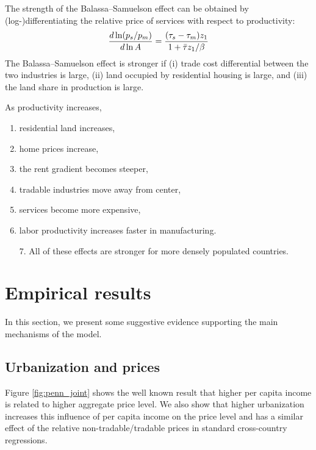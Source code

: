 \documentclass[12pt]{article}
\begin{document}
The strength of the Balassa--Samuelson effect can be obtained by (log-)differentiating the relative price of services with respect to productivity:
\[
\frac{d\ln (p_s/p_m)}{d\ln A} = \frac{(\tau_s-\tau_m)z_1}{1+\Bar\tau z_1/\beta}
\]
The Balassa--Samuelson effect is stronger if (i) trade cost differential between the two industries is large,       (ii) land occupied by residential housing is large, and (iii) the land share in production is large.



As productivity increases,
\begin{enumerate}
    \item residential land increases,
    \item home prices increase,
    \item the rent gradient becomes steeper,
	\item tradable industries move away from center,
    \item services become more expensive,
	\item labor productivity increases faster in manufacturing.
\end{enumerate}
\begin{enumerate}
	\item[7.] All of these effects are stronger for more densely populated countries.
\end{enumerate}





\section{Empirical results}\label{empirics}
In this section, we present some suggestive evidence supporting the
main mechanisms of the model.

\subsection{Urbanization and prices}
Figure \ref{fig:penn_joint} shows the well known result that higher
per capita income is related to higher aggregate price level. We also show that
higher urbanization increases this influence of per capita income on
the price level and has a similar effect of the relative
non-tradable/tradable prices in standard cross-country regressions.
\end{document}
